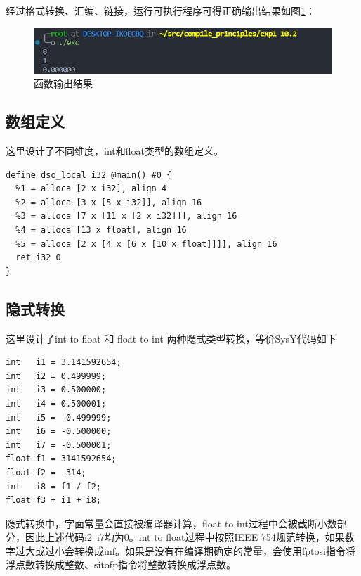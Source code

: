 \documentclass[UTF8,a4paper,10pt]{ctexart}
\begin{document}
经过格式转换、汇编、链接，运行可执行程序可得正确输出结果如图\ref{pic:9}：
\begin{figure}[H]
  \centering
  \includegraphics[width=\textwidth]{figure/exc.png}
  \caption{函数输出结果}
  \label{pic:9}
\end{figure}

\subsection{数组定义}

这里设计了不同维度，int和float类型的数组定义。

\begin{verbatim}
define dso_local i32 @main() #0 {
  %1 = alloca [2 x i32], align 4
  %2 = alloca [3 x [5 x i32]], align 16
  %3 = alloca [7 x [11 x [2 x i32]]], align 16
  %4 = alloca [13 x float], align 16
  %5 = alloca [2 x [4 x [6 x [10 x float]]]], align 16
  ret i32 0
}
\end{verbatim}

\subsection{隐式转换}

这里设计了int to float 和 float to int 两种隐式类型转换，等价SysY代码如下

\begin{verbatim}
int   i1 = 3.141592654;
int   i2 = 0.499999;
int   i3 = 0.500000;
int   i4 = 0.500001;
int   i5 = -0.499999;
int   i6 = -0.500000;
int   i7 = -0.500001;
float f1 = 3141592654;
float f2 = -314;
int   i8 = f1 / f2;
float f3 = i1 + i8;
\end{verbatim}

隐式转换中，字面常量会直接被编译器计算，float to int过程中会被截断小数部分，因此上述代码i2~i7均为0。int to float过程中按照IEEE 754规范转换，如果数字过大或过小会转换成inf。如果是没有在编译期确定的常量，会使用fptosi指令将浮点数转换成整数、sitofp指令将整数转换成浮点数。
\end{document}
